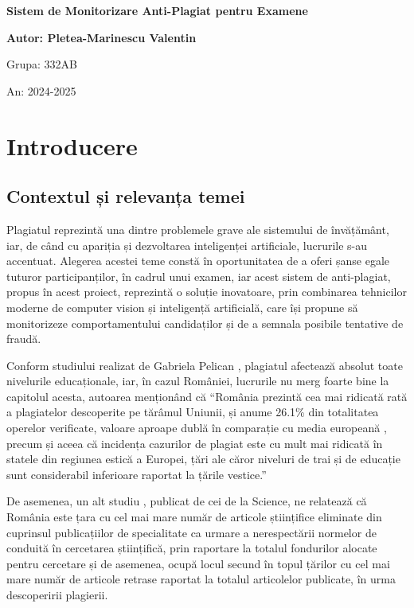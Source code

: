 \documentclass[12pt,a4paper]{article}
\begin{document}
\begin{titlepage}
    \centering
    {\huge\bfseries Sistem de Monitorizare Anti-Plagiat pentru Examene \par}
    \vspace{2cm}
    {\large\bfseries Autor: Pletea-Marinescu Valentin \par}
    {\large Grupa: 332AB \par}
    {\large An: 2024-2025 \par}
\end{titlepage}

\tableofcontents
\newpage

\section{Introducere}

\subsection{Contextul și relevanța temei}

\hspace{6mm}Plagiatul reprezintă una dintre problemele grave ale sistemului de
învățământ, iar, de când cu apariția și dezvoltarea inteligenței
artificiale, lucrurile s-au accentuat. Alegerea acestei teme constă în
oportunitatea de a oferi șanse egale tuturor participanților, în
cadrul unui examen, iar acest sistem de anti-plagiat, propus în acest
proiect, reprezintă o soluție inovatoare, prin combinarea tehnicilor
moderne de computer vision și inteligență artificială, care își
propune să monitorizeze comportamentului candidaților și de a semnala
posibile tentative de fraudă.

Conform studiului realizat de Gabriela Pelican \cite{pelican}, plagiatul
afectează absolut toate nivelurile educaționale, iar, în cazul
României, lucrurile nu merg foarte bine la capitolul acesta, autoarea
menționând că ``România prezintă cea mai ridicată rată a plagiatelor
descoperite pe tărâmul Uniunii, și anume 26.1\% din totalitatea
operelor verificate, valoare aproape dublă în comparație cu media
europeană , precum și aceea că incidența cazurilor de plagiat este cu
mult mai ridicată în statele din regiunea estică a Europei, țări ale
căror niveluri de trai și de educație sunt considerabil inferioare
raportat la țările vestice.''

De asemenea, un alt studiu \cite{science}, publicat de cei de la Science, ne
relatează că România este țara cu cel mai mare număr de articole
științifice eliminate din cuprinsul publicațiilor de specialitate ca
urmare a nerespectării normelor de conduită în cercetarea științifică,
prin raportare la totalul fondurilor alocate pentru cercetare și de
asemenea, ocupă locul secund în topul țărilor cu cel mai mare număr de
articole retrase raportat la totalul articolelor publicate, în urma
descoperirii plagierii.
\end{document}
